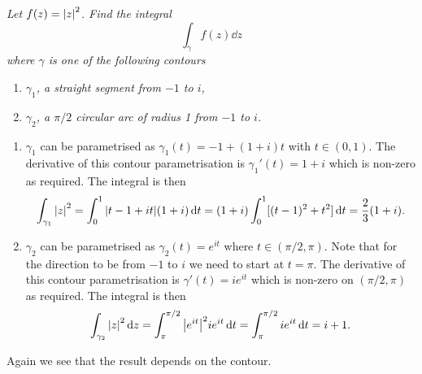 \documentclass{article}
\begin{document}
    \begin{example}\label{exa:integral 3}
        \textit{
            Let \(f(z) = \abs{z}^2\).
            Find the integral
        }
            \[\int_\gamma f(z)\dd{z}\]
        \textit{
            where \(\gamma\) is one of the following contours
        }
        \begin{enumerate}[label=\textit{\arabic*.}]
            \item \textit{\(\gamma_1\), a straight segment from \(-1\) to \(i\),}
            \item \textit{\(\gamma_2\), a \(\pi/2\) circular arc of radius 1 from \(-1\) to \(i\).}
        \end{enumerate}
        \begin{enumerate}
            \item \(\gamma_1\) can be parametrised as \(\gamma_1(t) = -1 + (1 + i)t\) with \(t\in(0, 1)\).
            The derivative of this contour parametrisation is \(\gamma_1'(t) = 1 + i\) which is non-zero as required.
            The integral is then
            \[\int_{\gamma_1} \abs{z}^2 = \int_0^1 \abs{t - 1 + it}(1 + i)\dd{t} = (1 + i)\int_0^1 [(t - 1)^2 + t^2] \dd{t} = \frac{2}{3}(1 + i).\]
            
            \item \(\gamma_2\) can be parametrised as \(\gamma_2(t) = e^{it}\) where \(t\in(\pi/2, \pi)\).
            Note that for the direction to be from \(-1\) to \(i\) we need to start at \(t = \pi\).
            The derivative of this contour parametrisation is \(\gamma'(t) = ie^{it}\) which is non-zero on \((\pi/2, \pi)\) as required.
            The integral is then
            \[\int_{\gamma_2} \abs{z}^2\dd{z} = \int_{\pi}^{\pi/2} \abs{e^{it}}^2 ie^{it} \dd{t} = \int_{\pi}^{\pi/2} ie^{it} \dd{t} = i + 1.\]
        \end{enumerate}
        Again we see that the result depends on the contour.
    \end{example}
\end{document}
